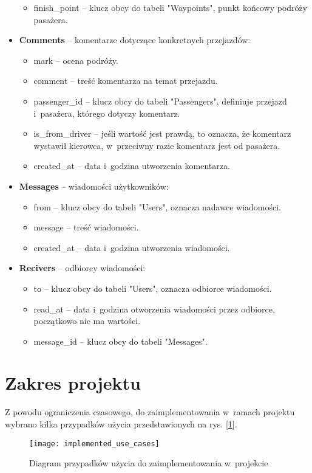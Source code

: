 \documentclass[eng,archivemode]{mgr}
\begin{document}
\begin{itemize}
\begin{itemize}
		\item finish\_point -- klucz obcy do tabeli "Waypoints", punkt końcowy podróży pasażera.
	\end{itemize}
	\item \textbf{Comments} -- komentarze dotyczące konkretnych przejazdów:
	\begin{itemize}
		\item mark --  ocena podróży.
		\item comment -- treść komentarza na temat przejazdu.
		\item passenger\_id -- klucz obcy do tabeli "Passengers", definiuje przejazd i~pasażera, którego dotyczy komentarz.
		\item is\_from\_driver -- jeśli wartość jest prawdą, to oznacza, że komentarz wystawił kierowca, w~przeciwny razie komentarz jest od pasażera.
		\item created\_at -- data i~godzina utworzenia komentarza.
	\end{itemize}
	\item \textbf{Messages} -- wiadomości użytkowników:
	\begin{itemize}
		\item from -- klucz obcy do tabeli "Users", oznacza nadawce wiadomości.
		\item message -- treść wiadomości.
		\item created\_at -- data i~godzina utworzenia wiadomości.
	\end{itemize}
	\item \textbf{Recivers} -- odbiorcy wiadomości:
	\begin{itemize}
		\item to -- klucz obcy do tabeli "Users", oznacza odbiorce wiadomości.
		\item read\_at -- data i~godzina otworzenia wiadomości przez odbiorce, początkowo nie ma wartości.
		\item message\_id -- klucz obcy do tabeli "Messages".
	\end{itemize}
\end{itemize}
\newpage
\section{Zakres projektu}
\label{sec:zakres}
Z powodu ograniczenia czasowego, do zaimplementowania w~ramach projektu wybrano kilka przypadków użycia przedstawionych na rys. [\ref{fig:use_cases}].
\begin{figure}[H]
	\centering
	\texttt{[image: implemented\_use\_cases]}
	\caption{Diagram przypadków użycia do zaimplementowania w~projekcie}
	\label{fig:use_cases}
\end{figure}
\newpage
\end{document}
